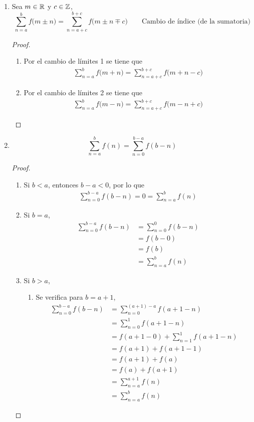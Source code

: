 \begin{enumerate}[label=\alph*)]
  \item Sea $m\in \mathbb{R}$ y $c\in \mathbb{Z}$, \[\sum_{n=a}^{b}f\bigl(m\pm n\bigr) = \sum_{n=a+c}^{b+c}f\bigl(m\pm n \mp c\bigr) \qquad \text{Cambio de índice (de la sumatoria)}\]
  \begin{proof}\leavevmode
    \begin{enumerate}[label=\roman*)]
      \item Por el cambio de límites 1 se tiene que 
      \begin{align*}
        \sum_{n=a}^{b}f\bigl(m+ n\bigr) = \sum_{n=a+c}^{b+c}f\bigl(m+n- c\bigr)
      \end{align*}
      \item Por el cambio de límites 2 se tiene que
      \begin{align*}
        \sum_{n=a}^{b}f\bigl(m-n\bigr) = \sum_{n=a+c}^{b+c}f\bigl(m-n+c\bigr)
      \end{align*}
    \end{enumerate}
  \end{proof}

  \item \[\sum_{n=a}^{b}f(n) = \sum_{n=0}^{b-a} f(b-n)\]
  \begin{proof}\leavevmode
    \begin{enumerate}[label=\Roman*)]
    \item Si $b<a$, entonces $b-a<0$, por lo que
    \begin{align*}
      \sum_{n=0}^{b-a} f(b-n) = 0 = \sum_{n=a}^{b}f(n)
    \end{align*}
    
    \item Si $b=a$,
    \begin{align*}
      \sum_{n=0}^{b-a} f(b-n) &= \sum_{n=0}^{0} f(b-n)\\
      &= f(b-0)\\
      &= f(b)\\
      &= \sum_{n=a}^{b} f(n)
    \end{align*}
    

    \item Si $b>a$,
    \begin{enumerate}[label=\roman*)]
      \item Se verifica para $b=a+1$,
      \begin{align*}
        \sum_{n=0}^{b-a} f(b-n) &= \sum_{n=0}^{(a+1)-a} f(a+1-n)\\
        &= \sum_{n=0}^{1} f(a+1-n)\\
        &= f(a+1-0) + \sum_{n=1}^{1} f(a+1-n)\\
        &= f(a+1) + f(a+1-1)\\
        &= f(a+1) + f(a)\\
        &= f(a) + f(a+1)\\
        &= \sum_{n=a}^{a+1} f(n)\\
        &= \sum_{n=a}^{b} f(n)
      \end{align*}


\end{enumerate}
\end{enumerate}
\end{proof}
\end{enumerate}
